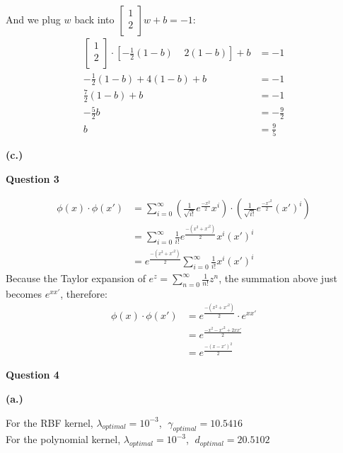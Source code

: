 \documentclass{article}
\begin{document}
And we plug $w$ back into $\begin{bmatrix}1 \\ 2 \\\end{bmatrix} w + b = -1$:
\begin{align*}
    \begin{bmatrix}1 \\ 2 \\\end{bmatrix} \cdot \left[-\frac{1}{2}(1-b) \;\;\;\; 2(1-b)\right] + b &= -1
    \\ -\frac{1}{2}(1-b) + 4(1-b) + b &= -1
    \\ \frac{7}{2}(1-b) + b &= -1
    \\ -\frac{5}{2} b &= -\frac{9}{2}
    \\ b &= \frac{9}{5}
\end{align*}
\begin{center}
\end{center}

\vspace{5mm}\textbf{(c.)}


\pagebreak
\begin{spacing}{3}{\bfseries\LARGE Question 3}\end{spacing}
\begin{align*}
    \phi (x) \cdot \phi (x') &= \sum_{i=0}^{\infty}
    \left( \frac{1}{\sqrt{i!}} e^{\frac{-x^2}{2}}x^i \right) \cdot 
    \left( \frac{1}{\sqrt{i!}} e^{\frac{-x'^2}{2}}(x')^i \right)
    \\&= \sum_{i=0}^{\infty} \frac{1}{i!} e^{\frac{-(x^2+x'^2)}{2}} x^i(x')^i
    \\&= e^{\frac{-(x^2+x'^2)}{2}}
    \sum_{i=0}^{\infty} \frac{1}{i!} x^i(x')^i
\end{align*}
Because the Taylor expansion of $e^z = \sum_{n=0}^{\infty} \frac{1}{n!}z^n$, 
the summation above just becomes $e^{xx'}$, therefore:
\begin{align*}
    \phi (x) \cdot \phi (x') &= e^{\frac{-(x^2+x'^2)}{2}} \cdot e^{xx'}
    \\&= e^{\frac{-x^2 -x'^2 + 2xx'}{2}}
    \\&= e^{\frac{-(x - x')^2}{2}}
\end{align*}

\pagebreak
\begin{spacing}{4}{\bfseries\LARGE Question 4}\end{spacing}
\textbf{(a.)}
\begin{flushleft}
    For the RBF kernel, $\lambda_{optimal} = 10^{-3}$, $\;\gamma_{optimal} = 10.5416$\\
    For the polynomial kernel, $\lambda_{optimal} = 10^{-3}$, $\;d_{optimal} = 20.5102$
\end{flushleft}
\end{document}
